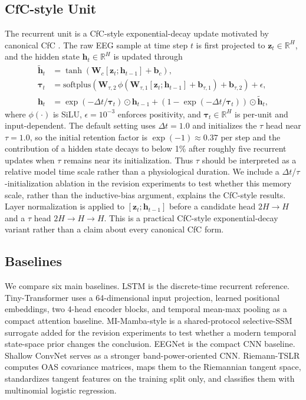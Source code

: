 \documentclass[journal]{IEEEtran}
\begin{document}
\subsection{CfC-style Unit}
The recurrent unit is a CfC-style exponential-decay update motivated by canonical CfC \cite{hasani2022cfc}. The raw EEG sample at time step $t$ is first projected to $\mathbf{z}_t \in \mathbb{R}^{H}$, and the hidden state $\mathbf{h}_t \in \mathbb{R}^{H}$ is updated through
\begin{align}
\tilde{\mathbf{h}}_t &= \tanh\!\left(\mathbf{W}_c[\mathbf{z}_t; \mathbf{h}_{t-1}] + \mathbf{b}_c\right), \\
\boldsymbol{\tau}_t &= \mathrm{softplus}\!\left(\mathbf{W}_{\tau,2}\,\phi\!\left(\mathbf{W}_{\tau,1}[\mathbf{z}_t; \mathbf{h}_{t-1}] + \mathbf{b}_{\tau,1}\right) + \mathbf{b}_{\tau,2}\right) + \epsilon, \\
\mathbf{h}_t &= \exp(-\Delta t / \boldsymbol{\tau}_t) \odot \mathbf{h}_{t-1}
+ \left(1 - \exp(-\Delta t / \boldsymbol{\tau}_t)\right) \odot \tilde{\mathbf{h}}_t ,
\end{align}
where $\phi(\cdot)$ is SiLU, $\epsilon = 10^{-3}$ enforces positivity, and $\boldsymbol{\tau}_t \in \mathbb{R}^{H}$ is per-unit and input-dependent. The default setting uses $\Delta t = 1.0$ and initializes the $\tau$ head near $\tau=1.0$, so the initial retention factor is $\exp(-1)\approx0.37$ per step and the contribution of a hidden state decays to below 1\% after roughly five recurrent updates when $\tau$ remains near its initialization. Thus $\tau$ should be interpreted as a relative model time scale rather than a physiological duration. We include a $\Delta t$/$\tau$-initialization ablation in the revision experiments to test whether this memory scale, rather than the inductive-bias argument, explains the CfC-style results. Layer normalization is applied to $[\mathbf{z}_t; \mathbf{h}_{t-1}]$ before a candidate head $2H \rightarrow H$ and a $\tau$ head $2H \rightarrow H \rightarrow H$. This is a practical CfC-style exponential-decay variant rather than a claim about every canonical CfC form.

\subsection{Baselines}
We compare six main baselines. LSTM \cite{hochreiter1997long} is the discrete-time recurrent reference. Tiny-Transformer uses a 64-dimensional input projection, learned positional embeddings, two 4-head encoder blocks, and temporal mean-max pooling as a compact attention baseline. MI-Mamba-style is a shared-protocol selective-SSM surrogate added for the revision experiments to test whether a modern temporal state-space prior changes the conclusion. EEGNet \cite{lawhern2018eegnet} is the compact CNN baseline. Shallow ConvNet \cite{schirrmeister2017deep} serves as a stronger band-power-oriented CNN. Riemann-TSLR computes OAS covariance matrices, maps them to the Riemannian tangent space, standardizes tangent features on the training split only, and classifies them with multinomial logistic regression.
\end{document}
